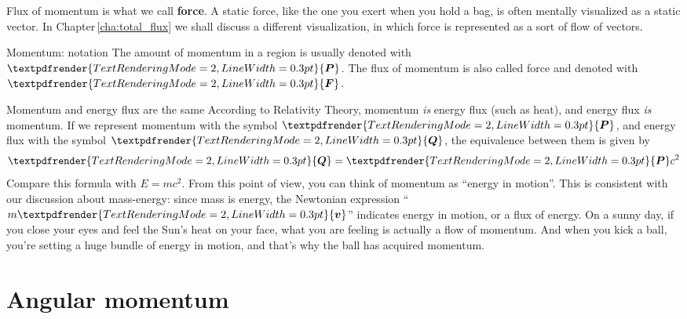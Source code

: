 \documentclass[a4paper,12pt,%
onecolumn,oneside,titlepage,%
british%
]{memoir}
\renewcommand*{\bm}[1]{\textpdfrender{TextRenderingMode=2,LineWidth=0.3pt}{\boldsymbol{#1}}}
\newcommand{\mynotew}[1]{{\footnotesize\color{midgrey}\faIcon{tools}\ #1}}
\renewcommand*{\|}[1][]{\nonscript\:#1\vert\nonscript\:\mathopen{}}
\newcommand*{\sect}{\S}%
\newcommand*{\chap}{Chapter}%
\newcommand*{\masse}{mass-energy}
\newcommand*{\yP}{\bm{P}}
\newcommand*{\yF}{\bm{F}}
\begin{document}
\medskip

Flux of momentum is what we call \textbf{force}. A static force, like the one you exert when you hold a bag, is often mentally visualized as a static vector. In \chap\,\ref{cha:total_flux} we shall discuss a different visualization, in which force is represented as a sort of flow of vectors.



\begin{definition}{Momentum: notation}
  The amount of momentum in a region is usually denoted with $\yP$. The flux of momentum is also called force and denoted with $\yF$.
\end{definition}



\begin{extra}{Momentum and energy flux are the same}
  According to Relativity Theory, momentum \emph{is} energy flux (such as heat), and energy flux \emph{is} momentum. If we represent momentum with the symbol $\bm{P}$, and energy flux with the symbol $\bm{Q}$, the equivalence between them is given by
  \begin{equation}
    \label{eq:momentum_heat}
    \bm{Q} = \bm{P}c^{2}
  \end{equation}
  Compare this formula with $E=mc^{2}$. From this point of view, you can think of momentum as \enquote{energy in motion}. This is consistent with our discussion about \masse: since mass is energy, the Newtonian expression \enquote{$m\bm{v}$} indicates energy in motion, or a flux of energy. On a sunny day, if you close your eyes and feel the Sun's heat on your face, what you are feeling is actually a flow of momentum. And when you kick a ball, you're setting a huge bundle of energy in motion, and that's why the ball has acquired momentum.
\end{extra}



\section{Angular momentum}
\label{sec:intro_angmomentum}
\end{document}
